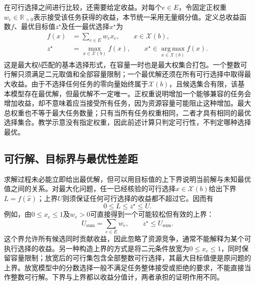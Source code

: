 在可行选择之间进行比较，还需要给定收益。对每个$e\in E$，令固定正权重$w_e\in\mathbb{R}_{>0}$表示接受该任务获得的收益，本节统一采用无量纲分值。定义总收益函数$f$、最优目标值$z^\star$及任一最优选择$x^\star$为
\begin{align}
 f(x)&=\sum_{e\in E}w_ex_e,\qquad x\in\mathcal{X}(b),
 \label{s0102:weight_function}\\
 z^\star&=\max_{x\in\mathcal{X}(b)}f(x),\qquad
 x^\star\in\operatorname*{arg\,max}_{x\in\mathcal{X}(b)}f(x).
 \label{s0102:optimal_choice}
\end{align}
这是最大权$b$匹配的基本选择形式，在容量一时也是最大权集合打包。一个整数可行解只须满足二元取值和全部容量限制；一个最优解还须在所有可行选择中取得最大收益。由于不选择任何任务的零向量始终属于$\mathcal{X}(b)$，且候选集合有限，该基本模型存在最优解，但最优解不一定唯一。正权重说明增加一个能够兼容的任务会增加收益，却不意味着应当接受所有任务，因为资源容量可能阻止这种增加。最大总权重也不等于最大任务数量；只有当所有任务权重相同，二者才具有相同的最优选择集合。教学示意没有指定权重，因此前述计算只判定可行性，不判定哪种选择最优。

\subsection{可行解、目标界与最优性差距}

求解过程未必能立即给出最优解，但可以用目标值的上下界说明当前解与未知最优值之间的关系。对最大化问题，任一已经核验的可行选择$\widehat{x}\in\mathcal{X}(b)$给出下界$L=f(\widehat{x})$；上界$U$则须保证任何可行选择的收益都不超过它。因而有
\begin{equation}
 0\leq L\leq z^\star\leq U.
 \label{s0102:objective_bounds}
\end{equation}
例如，由$0\leq x_e\leq1$及$w_e>0$可直接得到一个可能较松但有效的上界：
\begin{equation}
 U_{\mathrm{sum}}=\sum_{e\in E}w_e,\qquad z^\star\leq U_{\mathrm{sum}}.
 \label{s0102:sum_bound}
\end{equation}
这个界允许所有候选同时贡献收益，因此忽略了资源竞争，通常不能解释为某个可执行选择的收益。另一种构造上界的方式是将二元条件放宽为$0\leq x_e\leq1$，同时保留容量限制；放宽后的可行集包含全部整数可行选择，其最大目标值便是原问题的上界。放宽模型中的分数选择一般不满足任务整体接受或拒绝的要求，不能直接当作整数可行解。下界与上界都以收益分值计，两者承担的证明作用不同。

